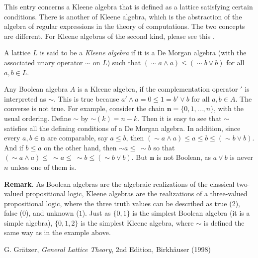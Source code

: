 \documentclass[12pt]{article}
\begin{document}
This entry concerns a Kleene algebra that is defined as a lattice satisfying certain conditions.  There is another  of Kleene algebra, which is the abstraction of the algebra of regular expressions in the theory of computations.  The two concepts are different.  For Kleene algebras of the second kind, please see this .

A lattice $L$ is said to be a \emph{Kleene algebra} if it is a De Morgan algebra (with the associated unary operator $\sim$ on $L$) such that $(\sim a\wedge a)\le (\sim b\vee b)$ for all $a,b\in L$.

Any Boolean algebra $A$ is a Kleene algebra, if the complementation operator $'$ is interpreted as $\sim$.  This is true because $a'\wedge a=0\le 1=b'\vee b$ for all $a, b\in A$.  The converse is not true.  For example, consider the chain $\mathbf{n}=\lbrace 0,1,\ldots,n\rbrace$, with the usual ordering. Define $\sim$ by $\sim(k)=n-k$.  Then it is easy to see that $\sim$ satisfies all the defining conditions of a De Morgan algebra.  In addition, since every $a,b\in \mathbf{n}$ are comparable, say $a\le b$, then $(\sim a\wedge a)\le a\le b\le (\sim b\vee b)$.  And if $b\le a$ on the other hand, then $\sim a\le\ \sim b$ so that $(\sim a\wedge a)\le\ \sim a\le\ \sim b\le (\sim b\vee b)$.  But $\mathbf{n}$ is not Boolean, as $a\vee b$ is never $n$ unless one of them is.

\textbf{Remark}.  As Boolean algebras are the algebraic realizations of the classical two-valued propositional logic, Kleene algebras are the  realizations of a three-valued propositional logic, where the three truth values can be described as true ($2$), false ($0$), and unknown ($1$).  Just as $\lbrace 0,1\rbrace$ is the simplest Boolean algebra (it is a simple algebra), $\lbrace 0,1,2\rbrace$ is the simplest Kleene algebra, where $\sim$ is defined the same way as in the example above.

\begin{thebibliography}{6}
 G. Gr\"atzer, {\it General Lattice Theory}, 2nd Edition, Birkh\"auser (1998)
\end{thebibliography}
\end{document}
